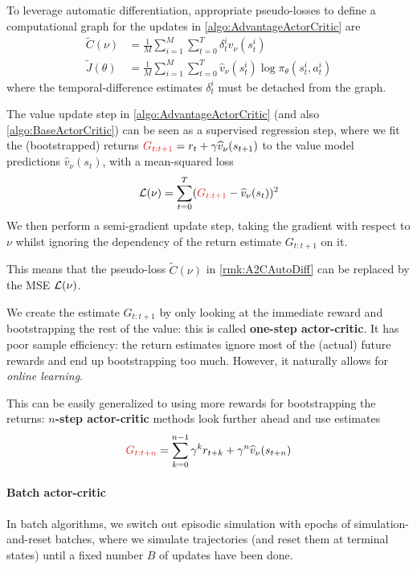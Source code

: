 \documentclass[../course-notes.tex]{subfiles}
\begin{document}
\begin{remark}\label{rmk:A2CAutoDiff}
	To leverage automatic differentiation, appropriate pseudo-losses to define a computational graph for the updates in \cref{algo:AdvantageActorCritic} are
	\begin{subequations}
	\begin{align}
	\tilde{C}(\nu) &= \frac{1}{M}\sum_{i=1}^M
	\sum_{t=0}^T\delta^i_t  \widehat{v}_\nu(s^i_t)  \\
	\tilde{J}(\theta) &=
	\frac{1}{M}\sum_{i=1}^M
	\sum_{t=0}^T \widehat{v}_\nu(s^i_t) \log\pi_\theta(s^i_t,a^i_t)
	\end{align}
	\end{subequations}
	where the temporal-difference estimates $\delta^i_t$ must be detached from the graph.
\end{remark}


The value update step in \cref{algo:AdvantageActorCritic} (and also \cref{algo:BaseActorCritic}) can be seen as a supervised regression step, where we fit the (bootstrapped) returns ${\redfont G_{t:t+1}} = r_t + \gamma\widehat{v}_\nu(s_{t+1})$ to the value model predictions $\widehat{v}_\nu(s_t)$, with a mean-squared loss
\begin{equation}
	\calL(\nu) =
	\sum_{t=0}^T ({\redfont G_{t:t+1}} - \widehat{v}_{\nu}(s_t))^2
\end{equation}
We then perform a semi-gradient update step, taking the gradient with respect to $\nu$ whilst ignoring the dependency of the return estimate $G_{t:t+1}$ on it.

\begin{remark}
This means that the pseudo-loss $\tilde{C}(\nu)$ in \cref{rmk:A2CAutoDiff} can be replaced by the MSE $\mathcal{L}(\nu)$.
\end{remark}


We create the estimate $G_{t:t+1}$ by only looking at the immediate reward and bootstrapping the rest of the value: this is called \textbf{one-step actor-critic}. It has poor sample efficiency: the return estimates ignore most of the (actual) future rewards and end up bootstrapping too much. However, it naturally allows for \textit{online learning}.	

This can be easily generalized to using more rewards for bootstrapping the returns: \textbf{$n$-step actor-critic} methods look further ahead and use estimates 
\[
	{\redfont G_{t:t+n}}
	= \sum_{k=0}^{n-1}\gamma^k r_{t+k} + \gamma^n \widehat{v}_\nu(s_{t+n})
\]


\paragraph{Batch actor-critic} In batch algorithms, we switch out episodic simulation with epochs of simulation-and-reset batches, where we simulate trajectories (and reset them at terminal states) until a fixed number $B$ of updates have been done.
\end{document}
